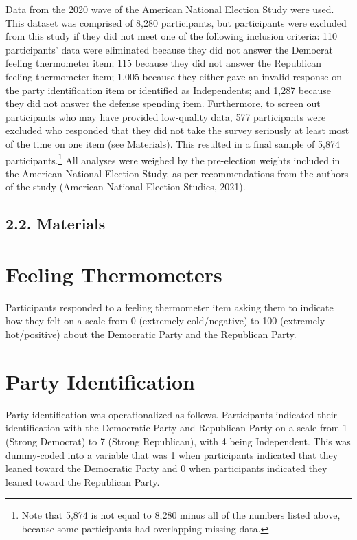 \documentclass[authordate, meta]{jote-new-article}
\begin{document}
	Data from the 2020 wave of the American National Election Study were used. This dataset was comprised of 8,280 participants, but participants were excluded from this study if they did not meet one of the following inclusion criteria: 110 participants' data were eliminated because they did not answer the Democrat feeling thermometer item; 115 because they did not answer the Republican feeling thermometer item; 1,005 because they either gave an invalid response on the party identification item or identified as Independents; and 1,287 because they did not answer the defense spending item. Furthermore, to screen out participants who may have provided low-quality data, 577 participants were excluded who responded that they did not take the survey seriously at least most of the time on one item (see Materials). This resulted in a final sample of 5,874 participants.\footnote{ Note that 5,874 is not equal to 8,280 minus all of the numbers listed above, because some participants had overlapping missing data.} All analyses were weighed by the pre-election weights included in the American National Election Study, as per recommendations from the authors of the study (American National Election Studies, 2021).



	\subsection{2.2. Materials}



	\section{\textbf{Feeling Thermometers}}



	Participants responded to a feeling thermometer item asking them to indicate how they felt on a scale from 0 (extremely cold/negative) to 100 (extremely hot/positive) about the Democratic Party and the Republican Party.



	\section{\textbf{Party Identification}}



	Party identification was operationalized as follows. Participants indicated their identification with the Democratic Party and Republican Party on a scale from 1 (Strong Democrat) to 7 (Strong Republican), with 4 being Independent. This was dummy-coded into a variable that was 1 when participants indicated that they leaned toward the Democratic Party and 0 when participants indicated they leaned toward the Republican Party.
\end{document}

